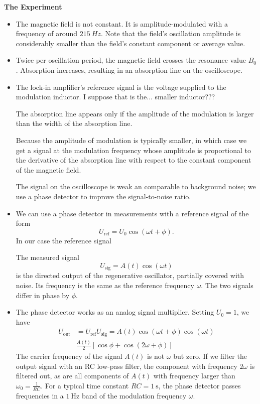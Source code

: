\documentclass[11pt, a4paper]{article}
\begin{document}
\iffalse
\textbf{The Experiment}
\begin{itemize}
	\item The magnetic field is not constant. It is amplitude-modulated with a frequency of around $ \SI{215}{Hz} $. Note that the field's oscillation amplitude is considerably smaller than the field's constant component or average value.
	
	\item Twice per oscillation period, the magnetic field crosses the resonance value $ B_{0} $. Absorption increases, resulting in an absorption line on the oscilloscope. 
	
	\item The lock-in amplifier's reference signal is the voltage supplied to the modulation inductor. I suppose that is the... smaller inductor???
	
	The absorption line appears only if the amplitude of the modulation is larger than the width of the absorption line.
	
	Because the amplitude of modulation is typically smaller, in which case we get a signal at the modulation frequency whose amplitude is proportional to the derivative of the absorption line with respect to the constant component of the magnetic field. 
	
	The signal on the oscilloscope is weak an comparable to background noise; we use a phase detector to improve the signal-to-noise ratio. 
	
	\item We can use a phase detector in measurements with a reference signal of the form
	\begin{equation*}
		U_{\text{ref}} = U_{0}\cos (\omega t + \phi). 
	\end{equation*}
	In our case the reference signal 
	
	The measured signal 
	\begin{equation*}
		U_{\text{sig}} = A(t) \cos (\omega t) 
	\end{equation*}
	is the directed output of the regenerative oscillator, partially covered with noise. Its frequency is the same as the reference frequency $ \omega $. The two signals differ in phase by $ \phi $.  
	
	\item The phase detector works as an analog signal multiplier. Setting $ U_{0} = 1$, we have
	\begin{align*}
		U_{\text{out}} &= U_{\text{ref}} U_{\text{sig}} = A(t) \cos(\omega t + \phi)\cos(\omega t)\\
		&\frac{A(t)}{2}[\cos \phi + \cos(2\omega + \phi)]
	\end{align*}
	The carrier frequency of the signal $ A(t) $ is not $ \omega $ but zero. If we filter the output signal with an RC low-pass filter, the component with frequency $ 2\omega $ is filtered out, as are all components of $ A(t) $ with frequency larger than $ \omega_{0} = \frac{1}{RC} $. For a typical time constant $ RC = \SI{1}{\second} $, the phase detector passes frequencies in a $ \SI{1}{\hertz} $ band of the modulation frequency $ \omega $. 
	

\end{itemize}
\end{document}
